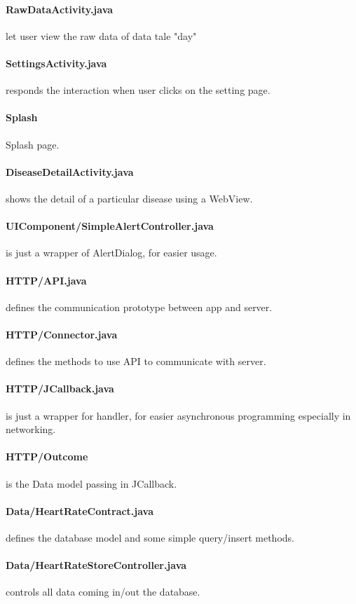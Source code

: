\documentclass[10pt,a4paper,final]{scrartcl}
\begin{document}
\paragraph{RawDataActivity.java} let user view the raw data of data tale "day"
\paragraph{SettingsActivity.java} responds the interaction when user clicks on the setting page.
\paragraph{Splash} Splash page.
\paragraph{DiseaseDetailActivity.java} shows the detail of a particular disease using a WebView.
\paragraph{UIComponent/SimpleAlertController.java} is just a wrapper of AlertDialog, for easier usage.
\paragraph{HTTP/API.java} defines the communication prototype between app and server.
\paragraph{HTTP/Connector.java} defines the methods to use API to communicate with server.
\paragraph{HTTP/JCallback.java} is just a wrapper for handler, for easier asynchronous programming especially in networking.
\paragraph{HTTP/Outcome} is the Data model passing in JCallback.
\paragraph{Data/HeartRateContract.java} defines the database model and some simple query/insert methods.
\paragraph{Data/HeartRateStoreController.java} controls all data coming in/out the database.
\end{document}
